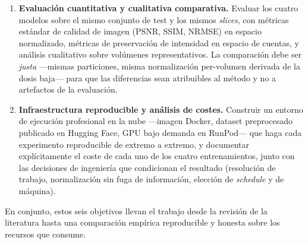 \begin{enumerate}[leftmargin=*]
    \item \textbf{Evaluación cuantitativa y cualitativa
    comparativa.} Evaluar los cuatro modelos sobre el mismo conjunto
    de test y los mismos \textit{slices}, con métricas estándar de
    calidad de imagen (PSNR, SSIM, NRMSE) en espacio normalizado,
    métricas de preservación de intensidad en espacio de cuentas, y
    análisis cualitativo sobre volúmenes representativos. La
    comparación debe ser \emph{justa} —mismas particiones, misma
    normalización per-volumen derivada de la dosis baja— para que
    las diferencias sean atribuibles al método y no a artefactos de
    la evaluación.

    \item \textbf{Infraestructura reproducible y análisis de
    costes.} Construir un entorno de ejecución profesional en la
    nube —imagen Docker, dataset preprocesado publicado en Hugging
    Face, GPU bajo demanda en RunPod— que haga cada experimento
    reproducible de extremo a extremo, y documentar explícitamente
    el coste de cada uno de los cuatro entrenamientos, junto con las
    decisiones de ingeniería que condicionan el resultado
    (resolución de trabajo, normalización sin fuga de información,
    elección de \textit{schedule} y de máquina).
\end{enumerate}

En conjunto, estos seis objetivos llevan el trabajo desde la revisión
de la literatura hasta una comparación empírica reproducible y honesta
sobre los recursos que consume.

